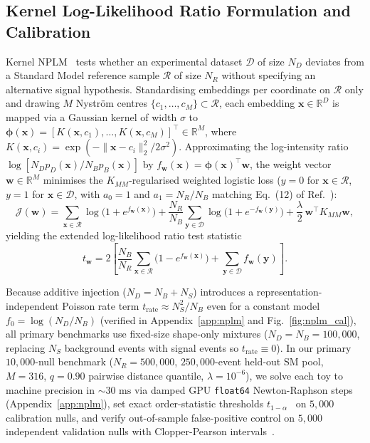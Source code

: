 \documentclass{article}
\begin{document}
\subsection{Kernel Log-Likelihood Ratio Formulation and Calibration}
\label{sec:nplm_calibration}

Kernel NPLM~\cite{NPLM2019,NPLM2021,KernelNPLM2022} tests whether an experimental dataset $\mathcal{D}$ of size $N_D$ deviates from a Standard Model reference sample $\mathcal{R}$ of size $N_R$ without specifying an alternative signal hypothesis. Standardising embeddings per coordinate on $\mathcal{R}$ only and drawing $M$ Nystr\"om centres $\{c_1, \dots, c_M\} \subset \mathcal{R}$, each embedding $\mathbf{x} \in \mathbb{R}^D$ is mapped via a Gaussian kernel of width $\sigma$ to $\boldsymbol{\phi}(\mathbf{x}) = [K(\mathbf{x}, c_1), \dots, K(\mathbf{x}, c_M)]^\top \in \mathbb{R}^M$, where $K(\mathbf{x}, c_i) = \exp(-\|\mathbf{x} - c_i\|_2^2 / 2\sigma^2)$. Approximating the log-intensity ratio $\log[N_D p_D(\mathbf{x}) / N_B p_B(\mathbf{x})]$ by $f_{\mathbf{w}}(\mathbf{x}) = \boldsymbol{\phi}(\mathbf{x})^\top \mathbf{w}$, the weight vector $\mathbf{w} \in \mathbb{R}^M$ minimises the $K_{MM}$-regularised weighted logistic loss ($y=0$ for $\mathbf{x}\in\mathcal{R}$, $y=1$ for $\mathbf{x}\in\mathcal{D}$, with $a_0 = 1$ and $a_1 = N_R / N_B$ matching Eq.~(12) of Ref.~\cite{KernelNPLM2022}):
\begin{equation}
    \mathcal{J}(\mathbf{w}) = \sum_{\mathbf{x} \in \mathcal{R}} \log\big(1 + e^{f_{\mathbf{w}}(\mathbf{x})}\big) + \frac{N_R}{N_B}\sum_{\mathbf{y} \in \mathcal{D}} \log\big(1 + e^{-f_{\mathbf{w}}(\mathbf{y})}\big) + \frac{\lambda}{2}\,\mathbf{w}^\top K_{MM}\mathbf{w} ,
\end{equation}
yielding the extended log-likelihood ratio test statistic
\begin{equation}
    t_{\mathbf{w}} = 2\left[\frac{N_B}{N_R}\sum_{\mathbf{x} \in \mathcal{R}}\big(1 - e^{f_{\mathbf{w}}(\mathbf{x})}\big) + \sum_{\mathbf{y} \in \mathcal{D}} f_{\mathbf{w}}(\mathbf{y})\right] .
\end{equation}

Because additive injection ($N_D = N_B + N_S$) introduces a representation-independent Poisson rate term $t_{\text{rate}} \approx N_S^2 / N_B$ even for a constant model $f_0 = \log(N_D / N_B)$ (verified in Appendix~\ref{app:nplm} and Fig.~\ref{fig:nplm_cal}), all primary benchmarks use fixed-size shape-only mixtures ($N_D = N_B = 100,000$, replacing $N_S$ background events with signal events so $t_{\text{rate}} \equiv 0$). In our primary $10,000$-null benchmark ($N_R = 500,000$, $250,000$-event held-out SM pool, $M = 316$, $q = 0.90$ pairwise distance quantile, $\lambda = 10^{-6}$), we solve each toy to machine precision in $\sim 30\text{ ms}$ via damped GPU \texttt{float64} Newton-Raphson steps (Appendix~\ref{app:nplm}), set exact order-statistic thresholds $t_{1-\alpha}$~\cite{PhipsonSmyth2010} on $5,000$ calibration nulls, and verify out-of-sample false-positive control on $5,000$ independent validation nulls with Clopper-Pearson intervals~\cite{ClopperPearson1934}.
\end{document}
